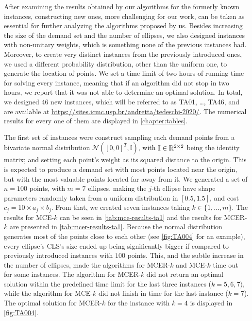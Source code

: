 After examining the results obtained by our algorithms for the formerly known instances, constructing new ones, more challenging for our work, can be taken as essential for further analyzing the algorithms proposed by us.
Besides increasing the size of the demand set and the number of ellipses, we also designed instances with non-unitary weights, which is something none of the previous instances had. 
Moreover, to create very distinct instances from the previously introduced ones, we used a different probability distribution, other than the uniform one, to generate the location of points.
We set a time limit of two hours of running time for solving every instance, meaning that if an algorithm did not stop in two hours, we report that it was not able to determine an optimal solution. 
In total, we designed 46 new instances, which will be referred to as TA01, \dots, TA46, and are available at \url{https://sites.icmc.usp.br/andretta/tedeschi-2020/}. The numerical results for every one of them are displayed in \autoref{chapter:tables}.

The first set of instances were construct sampling each demand points from a bivariate normal distribution $\mathcal{N}([0, 0]^T, \mathbb{I})$, with $\mathbb{I} \in \mathbb{R}^{2\times 2}$ being the identity matrix; and setting each point's weight as its squared distance to the origin. This is expected to produce a demand set with most points located near the origin, but with the most valuable points located far away from it.
We generated a set of $n=100$ points, with $m=7$ ellipses, making the $j$-th ellipse have shape parameters randomly taken from a uniform distribution in $[0.5, 1.5]$, and cost $c_j=10\times a_j \times b_j$. From that, we created seven instances taking $k \in \{1, \dots, m\}$. The results for MCE-$k$ can be seen in \autoref{tab:mce-results-ta1} and the results for MCER-$k$ are presented in \autoref{tab:mcer-results-ta1}. 
Because the normal distribution generates most of the points close to each other (see \autoref{fig:TA004} for an example), every ellipse's CLS's size ended up being significantly bigger if compared to previously introduced instances with $100$ points.
This, and the subtle increase in the number of ellipses, made the algorithms for MCER-$k$ and MCE-$k$ time out for some instances. The algorithm for MCER-$k$ did not return an optimal solution within the predefined time limit for the last three instances ($k=5, 6, 7)$, while the algorithm for MCE-$k$ did not finish in time for the last instance ($k=7$). The optimal solution for MCER-$k$ for the instance with $k=4$ is displayed in \autoref{fig:TA004}. 

